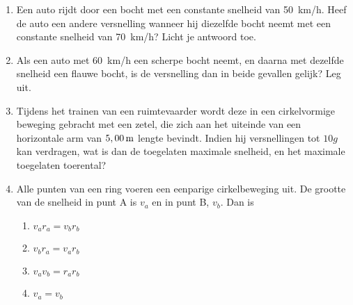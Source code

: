\documentclass{ximera}
\begin{document}
\begin{enumerate}
\item Een auto rijdt door een bocht met een constante snelheid van \SI{50}{km/h}. Heef de auto een andere versnelling wanneer hij diezelfde bocht neemt met een constante snelheid van \SI{70}{km/h}? Licht je antwoord toe.

\item Als een auto met \SI{60}{km/h} een scherpe bocht neemt, en daarna met dezelfde snelheid een flauwe bocht, is de versnelling dan in beide gevallen gelijk? Leg uit.

\item Tijdens het trainen van een ruimtevaarder wordt deze in een cir\-kel\-vor\-mi\-ge beweging gebracht met een zetel, die zich aan het uiteinde van een ho\-ri\-zon\-tale arm van $5,00\rm\,m$ lengte bevindt. Indien hij versnellingen tot $10g$ kan verdragen, wat is dan de toegelaten maximale snelheid, en het maximale toegelaten toerental?


\item 
\begin{minipage}[t]{0.5\textwidth}
Alle punten van een ring voeren een eenparige cirkelbeweging
uit. De grootte van de snelheid in punt A is $v_a$ en in punt B,
$v_b$. Dan is
\begin{enumerate}
\item $v_ar_a=v_br_b$
\item $v_br_a=v_ar_b$
\item $v_av_b=r_ar_b$
\item $v_a=v_b$
\end{enumerate}
\end{minipage}
\hspace{0.1\textwidth}
\begin{minipage}[t]{0.3\textwidth}
\end{minipage}


\end{enumerate}
\end{document}
